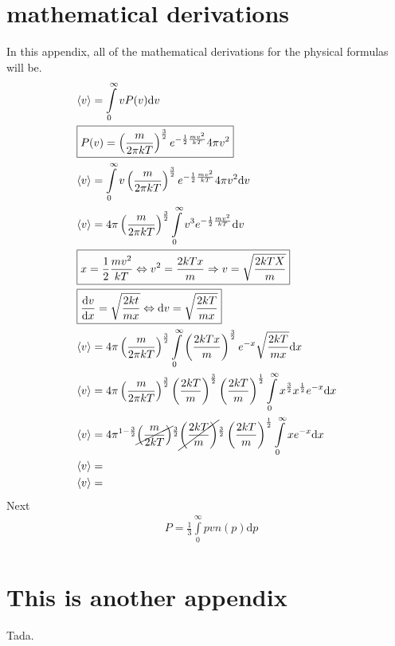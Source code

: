 \documentclass[reprint,english,notitlepage]{revtex4-1}  %
\newcommand{\dd}[1]{\mathrm{d}#1}
\begin{document}
\section{mathematical derivations}
	In this appendix, all of the mathematical derivations for the physical formulas will be. 
	\begin{eqnarray}
		&\langle v \rangle = \int\limits_0^{\infty} v P(v)\dd{v} \nonumber \\
		&\boxed{P(v) = \left( \frac{m}{2 \pi k T} \right) ^{\frac{3}{2}} e ^{-\frac{1}{2} \frac{mv^2}{kT}}4 \pi v^2} \nonumber\\
		&\langle v \rangle = \int\limits_0^{\infty} v \left( \frac{m}{2 \pi k T} \right) ^{\frac{3}{2}} e^{- \frac{1}{2}\frac{mv^2}{kT}}4 \pi v^2 \dd{v}\nonumber\\
		&\langle v \rangle = 4 \pi\left( \frac{m}{2 \pi k T} \right) ^{\frac{3}{2}}\int\limits_0^{\infty} v^3 e^{-\frac{1}{2}\frac{mv^2}{kT}} \dd{v}\nonumber \\
		&\boxed{x = \frac{1}{2}\frac{mv^2}{kT} \Leftrightarrow v^2= \frac{2kTx}{m} \Rightarrow v=\sqrt{\frac{2kTX}{m}}} \nonumber\\
		&\boxed{\frac{\dd{v}}{\dd{x}}= \sqrt{\frac{2kt}{mx}} \Leftrightarrow \dd{v}= \sqrt{\frac{2kT}{mx}}}\nonumber\\
		&\langle v \rangle = 4 \pi\left( \frac{m}{2 \pi k T} \right) ^{\frac{3}{2}}\int\limits_0^{\infty}\left( \frac{2kTx}{m} \right)^{\frac{3}{2}}e^{-x} \sqrt{\frac{2kT}{mx}} \dd{x}  \nonumber \\
		&\langle v \rangle = 4 \pi\left( \frac{m}{2 \pi k T} \right) ^{\frac{3}{2}} \left( \frac{2kT}{m} \right)^{\frac{3}{2}} \left( \frac{2 kT}{m} \right)^\frac{1}{2}  \int\limits_0^{\infty} x^{\frac{3}{2}}x^{\frac{1}{2}}e^{-x} \dd{x}\nonumber \\
		&\langle v \rangle = 4 \pi^{1-\frac{3}{2}} \cancel{\left(\frac{m}{2kT} \right)}^{\frac{3}{2}} \cancel{\left( \frac{2kT}{m} \right) }^{\frac{3}{2}}
			\left( \frac{2kT}{m} \right) ^{\frac{1}{2}} \int\limits_0^\infty x e^{-x} \dd{x}\nonumber \\
		&\langle v \rangle = \nonumber \\
		&\langle v \rangle = \nonumber 
	\end{eqnarray}
	Next
	\begin{eqnarray}
		&P = \frac{1}{3}\int \limits_0^{\infty} pvn(p) \dd{p} \nonumber \\
	\end{eqnarray}
	
\section{This is another appendix}\label{appendix}
Tada.
\end{document}
